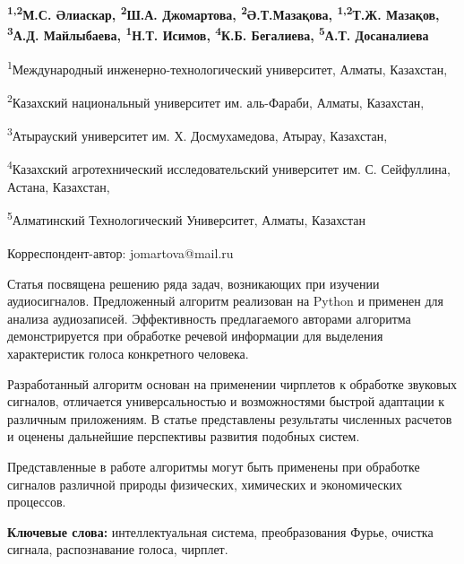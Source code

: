 
\begin{articleheader}

{\bfseries
\textsuperscript{1,2}М.С. Әлиаскар,
\textsuperscript{2}Ш.А. Джомартова\textsuperscript{\envelope },
\textsuperscript{2}Ә.Т.Мазақова,
\textsuperscript{1,2}Т.Ж. Мазақов,
\textsuperscript{3}А.Д. Майлыбаева,
\textsuperscript{1}Н.Т. Исимов,
\textsuperscript{4}К.Б. Бегалиева,
\textsuperscript{5}А.Т. Досаналиева
}
\end{articleheader}

\begin{affiliation}
\textsuperscript{1}Международный инженерно-технологический университет, Алматы, Казахстан,

\textsuperscript{2}Казахский национальный университет им. аль-Фараби, Алматы, Казахстан,

\textsuperscript{3}Атырауский университет им. Х. Досмухамедова, Атырау, Казахстан,

\textsuperscript{4}Казахский агротехнический исследовательский университет им. С. Сейфуллина, Астана, Казахстан,

\textsuperscript{5}Алматинский Технологический Университет, Алматы, Казахстан

\raggedright \textsuperscript{\envelope } Корреспондент-автор: jomartova@mail.ru
\end{affiliation}

Статья посвящена решению ряда задач, возникающих при изучении
аудиосигналов. Предложенный алгоритм реализован на Python и применен для
анализа аудиозаписей. Эффективность предлагаемого авторами алгоритма
демонстрируется при обработке речевой информации для выделения
характеристик голоса конкретного человека.

Разработанный алгоритм основан на применении чирплетов к обработке
звуковых сигналов, отличается универсальностью и возможностями быстрой
адаптации к различным приложениям. В статье представлены результаты
численных расчетов и оценены дальнейшие перспективы развития подобных
систем.

Представленные в работе алгоритмы могут быть применены при обработке
сигналов различной природы физических, химических и экономических
процессов.

{\bfseries Ключевые слова:} интеллектуальная система, преобразования Фурье,
очистка сигнала, распознавание голоса, чирплет.

